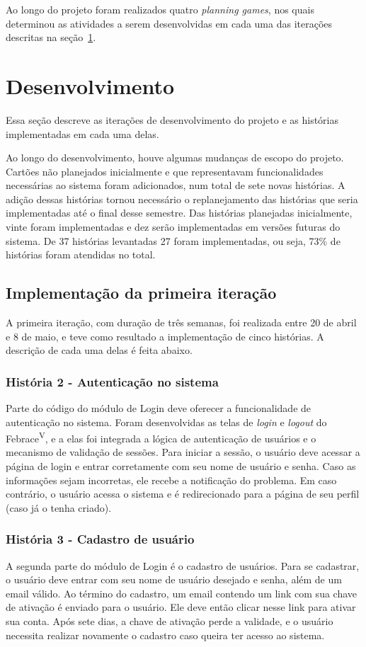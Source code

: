     Ao longo do projeto foram realizados quatro \textit{planning games}, nos quais determinou as atividades a serem desenvolvidas em cada uma das iterações descritas na seção~\ref{iteracoes}.

\section{Desenvolvimento}\label{iteracoes}

  Essa seção descreve as iterações de desenvolvimento do projeto e as histórias implementadas em cada uma delas.

  Ao longo do desenvolvimento, houve algumas mudanças de escopo do projeto. Cartões não planejados inicialmente e que representavam funcionalidades necessárias ao sistema foram adicionados, num total de sete novas histórias. A adição dessas histórias tornou necessário o replanejamento das histórias que seria implementadas até o final desse semestre. Das histórias planejadas inicialmente, vinte foram implementadas e dez serão implementadas em versões futuras do sistema. De 37 histórias levantadas 27 foram implementadas, ou seja, 73\% de histórias foram atendidas no total.

  \subsection{Implementação da primeira iteração}
    A primeira iteração, com duração de três semanas, foi realizada entre 20 de abril e 8 de maio, e teve como resultado a implementação de cinco histórias. A descrição de cada uma delas é feita abaixo.

    \subsubsection{História 2 - Autenticação no sistema}
      Parte do código do módulo de Login deve oferecer a funcionalidade de autenticação no sistema. Foram desenvolvidas as telas de \textit{login} e \textit{logout} do Febrace\textsuperscript{V}, e a elas foi integrada a lógica de autenticação de usuários e o mecanismo de validação de sessões. Para iniciar a sessão, o usuário deve acessar a página de login e entrar corretamente com seu nome de usuário e senha. Caso as informações sejam incorretas, ele recebe a notificação do problema. Em caso contrário, o usuário acessa o sistema e é redirecionado para a página de seu perfil (caso já o tenha criado).

    \subsubsection{História 3 - Cadastro de usuário}
      A segunda parte do módulo de Login é o cadastro de usuários. Para se cadastrar, o usuário deve entrar com seu nome de usuário desejado e senha, além de um email válido. Ao término do cadastro, um email contendo um link com sua chave de ativação é enviado para o usuário. Ele deve então clicar nesse link para ativar sua conta. Após sete dias, a chave de ativação perde a validade, e o usuário necessita realizar novamente o cadastro caso queira ter acesso ao sistema.


